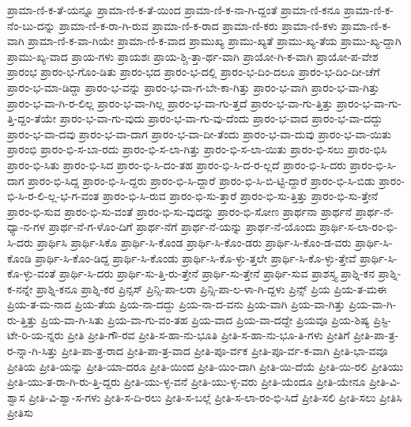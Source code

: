 {ಪ್ರಾಮಾ-ಣಿ-ಕ-ತೆ-ಯನ್ನೂ
ಪ್ರಾಮಾ-ಣಿ-ಕ-ತೆ-ಯಿಂದ
ಪ್ರಾಮಾ-ಣಿ-ಕ-ನಾ-ಗಿ-ದ್ದಂತೆ
ಪ್ರಾಮಾ-ಣಿ-ಕನೂ
ಪ್ರಾಮಾ-ಣಿ-ಕ-ನೆಂ-ಬು-ದನ್ನು
ಪ್ರಾಮಾ-ಣಿ-ಕ-ರಾ-ಗಿ-ರುವ
ಪ್ರಾಮಾ-ಣಿ-ಕ-ರಾದ
ಪ್ರಾಮಾ-ಣಿ-ಕರು
ಪ್ರಾಮಾ-ಣಿ-ಕಳು
ಪ್ರಾಮಾ-ಣಿ-ಕ-ವಾಗಿ
ಪ್ರಾಮಾ-ಣಿ-ಕ-ವಾ-ಗಿಯೇ
ಪ್ರಾಮಾ-ಣಿ-ಕ-ವಾದ
ಪ್ರಾಮುಖ್ಯ
ಪ್ರಾಮು-ಖ್ಯತೆ
ಪ್ರಾಮು-ಖ್ಯ-ತೆಯ
ಪ್ರಾಮು-ಖ್ಯ-ದ್ದಾಗಿ
ಪ್ರಾಮು-ಖ್ಯ-ವಾದ
ಪ್ರಾಯ-ಗಳು
ಪ್ರಾಯಶಃ
ಪ್ರಾಯ-ಶ್ಚಿ-ತ್ತಾ-ರ್ಥ-ವಾಗಿ
ಪ್ರಾಯೋ-ಗಿ-ಕ-ವಾಗಿ
ಪ್ರಾಯೋ-ಪ-ವೇಶ
ಪ್ರಾರಂಭ
ಪ್ರಾರಂ-ಭ-ಗೊಂ-ಡಿತು
ಪ್ರಾರಂ-ಭದ
ಪ್ರಾರಂ-ಭ-ದಲ್ಲಿ
ಪ್ರಾರಂ-ಭ-ದಿಂ-ದಲೂ
ಪ್ರಾರಂ-ಭ-ದಿಂ-ದೀ-ಚೆಗೆ
ಪ್ರಾರಂ-ಭ-ಮಾ-ಡಿದ್ದಾ
ಪ್ರಾರಂ-ಭ-ವನ್ನು
ಪ್ರಾರಂ-ಭ-ವಾ-ಗ-ಬೇ-ಕಾ-ಗಿತ್ತು
ಪ್ರಾರಂ-ಭ-ವಾಗಿ
ಪ್ರಾರಂ-ಭ-ವಾ-ಗಿತ್ತು
ಪ್ರಾರಂ-ಭ-ವಾ-ಗಿ-ರ-ಲಿಲ್ಲ
ಪ್ರಾರಂ-ಭ-ವಾ-ಗಿಲ್ಲ
ಪ್ರಾರಂ-ಭ-ವಾ-ಗು-ತ್ತದೆ
ಪ್ರಾರಂ-ಭ-ವಾ-ಗು-ತ್ತಿತ್ತು
ಪ್ರಾರಂ-ಭ-ವಾ-ಗು-ತ್ತಿ-ದ್ದಂ-ತೆಯೇ
ಪ್ರಾರಂ-ಭ-ವಾ-ಗು-ವುದು
ಪ್ರಾರಂ-ಭ-ವಾ-ಗು-ವು-ದೆಂದು
ಪ್ರಾರಂ-ಭ-ವಾದ
ಪ್ರಾರಂ-ಭ-ವಾ-ದದ್ದು
ಪ್ರಾರಂ-ಭ-ವಾ-ದವು
ಪ್ರಾರಂ-ಭ-ವಾ-ದಾಗ
ಪ್ರಾರಂ-ಭ-ವಾ-ದೀ-ತೆಂದು
ಪ್ರಾರಂ-ಭ-ವಾ-ದುವು
ಪ್ರಾರಂ-ಭ-ವಾ-ಯಿತು
ಪ್ರಾರಂಭಿ
ಪ್ರಾರಂ-ಭಿ-ಸ-ಬಾ-ರದು
ಪ್ರಾರಂ-ಭಿ-ಸ-ಲಾ-ಗಿತ್ತು
ಪ್ರಾರಂ-ಭಿ-ಸ-ಲಾ-ಯಿತು
ಪ್ರಾರಂ-ಭಿ-ಸಲು
ಪ್ರಾರಂ-ಭಿಸಿ
ಪ್ರಾರಂ-ಭಿ-ಸಿತು
ಪ್ರಾರಂ-ಭಿ-ಸಿದ
ಪ್ರಾರಂ-ಭಿ-ಸಿ-ದಂ-ತಹ
ಪ್ರಾರಂ-ಭಿ-ಸಿ-ದ-ರ-ಲ್ಲದೆ
ಪ್ರಾರಂ-ಭಿ-ಸಿ-ದರು
ಪ್ರಾರಂ-ಭಿ-ಸಿ-ದಾಗ
ಪ್ರಾರಂ-ಭಿ-ಸಿದ್ದ
ಪ್ರಾರಂ-ಭಿ-ಸಿ-ದ್ದರು
ಪ್ರಾರಂ-ಭಿ-ಸಿ-ದ್ದಾರೆ
ಪ್ರಾರಂ-ಭಿ-ಸಿ-ಬಿ-ಟ್ಟಿ-ದ್ದಾರೆ
ಪ್ರಾರಂ-ಭಿ-ಸಿ-ಬಿಡು
ಪ್ರಾರಂ-ಭಿ-ಸಿ-ರ-ಲಿ-ಲ್ಲ-ಭ-ಗ-ವಂತ
ಪ್ರಾರಂ-ಭಿ-ಸಿ-ರುವ
ಪ್ರಾರಂ-ಭಿ-ಸು-ತ್ತಾರೆ
ಪ್ರಾರಂ-ಭಿ-ಸು-ತ್ತಿತ್ತು
ಪ್ರಾರಂ-ಭಿ-ಸು-ತ್ತೇನೆ
ಪ್ರಾರಂ-ಭಿ-ಸುವ
ಪ್ರಾರಂ-ಭಿ-ಸು-ವಂತೆ
ಪ್ರಾರಂ-ಭಿ-ಸು-ವುದನ್ನು
ಪ್ರಾರಂ-ಭಿ-ಸೋಣ
ಪ್ರಾರ್ಥನಾ
ಪ್ರಾರ್ಥನೆ
ಪ್ರಾರ್ಥ-ನೆ-ಧ್ಯಾ-ನ-ಗಳ
ಪ್ರಾರ್ಥ-ನೆ-ಗ-ಳೊಂ-ದಿಗೆ
ಪ್ರಾರ್ಥ-ನೆಗೆ
ಪ್ರಾರ್ಥ-ನೆ-ಯನ್ನು
ಪ್ರಾರ್ಥ-ನೆ-ಯೊಂದು
ಪ್ರಾರ್ಥಿ-ಸ-ಲಾ-ರಂ-ಭಿ-ಸಿ-ದರು
ಪ್ರಾರ್ಥಿಸಿ
ಪ್ರಾರ್ಥಿ-ಸಿಕೊ
ಪ್ರಾರ್ಥಿ-ಸಿ-ಕೊಂಡ
ಪ್ರಾರ್ಥಿ-ಸಿ-ಕೊಂ-ಡರು
ಪ್ರಾರ್ಥಿ-ಸಿ-ಕೊಂ-ಡ-ವರು
ಪ್ರಾರ್ಥಿ-ಸಿ-ಕೊಂಡಿ
ಪ್ರಾರ್ಥಿ-ಸಿ-ಕೊಂ-ಡಿದ್ದ
ಪ್ರಾರ್ಥಿ-ಸಿ-ಕೊಂಡು
ಪ್ರಾರ್ಥಿ-ಸಿ-ಕೊ-ಳ್ಳು-ತ್ತಲೇ
ಪ್ರಾರ್ಥಿ-ಸಿ-ಕೊ-ಳ್ಳು-ತ್ತೇವೆ
ಪ್ರಾರ್ಥಿ-ಸಿ-ಕೊ-ಳ್ಳು-ವಂತೆ
ಪ್ರಾರ್ಥಿ-ಸಿ-ದರು
ಪ್ರಾರ್ಥಿ-ಸು-ತ್ತಿ-ರು-ತ್ತೇನೆ
ಪ್ರಾರ್ಥಿ-ಸು-ತ್ತೇನೆ
ಪ್ರಾರ್ಥಿ-ಸುವ
ಪ್ರಾಶಸ್ತ್ಯ
ಪ್ರಾಶ್ನಿ-ಕನ
ಪ್ರಾಶ್ನಿ-ಕ-ನನ್ನೇ
ಪ್ರಾಶ್ನಿ-ಕನೂ
ಪ್ರಾಶ್ನಿ-ಕರ
ಪ್ರಿನ್ಸಸ್
ಪ್ರಿನ್ಸಿ-ಪಾ-ಲರಾ
ಪ್ರಿನ್ಸಿ-ಪಾ-ಲ-ಳಾ-ಗಿ-ದ್ದಳು
ಪ್ರಿನ್ಸ್
ಪ್ರಿಯ
ಪ್ರಿಯ-ತ-ಮಈ
ಪ್ರಿಯ-ತ-ಮ-ನಾದ
ಪ್ರಿಯ-ತೆಯ
ಪ್ರಿಯ-ನಾ-ದದ್ದು
ಪ್ರಿಯ-ನಾ-ದ-ವನು
ಪ್ರಿಯ-ವಾಗಿ
ಪ್ರಿಯ-ವಾ-ಗಿತ್ತು
ಪ್ರಿಯ-ವಾ-ಗಿ-ರು-ತ್ತಿತ್ತು
ಪ್ರಿಯ-ವಾ-ಗಿ-ಸಿತು
ಪ್ರಿಯ-ವಾ-ಗು-ವಂ-ತಹ
ಪ್ರಿಯ-ವಾದ
ಪ್ರಿಯ-ವಾ-ದದ್ದೇ
ಪ್ರಿಯವೂ
ಪ್ರಿಯ-ಶಿಷ್ಯ
ಪ್ರಿಸ್ಟಿ-ಟೇ-ರಿ-ಯ-ನ್ನರು
ಪ್ರೀತಿ
ಪ್ರೀತಿ-ಗೌ-ರವ
ಪ್ರೀತಿ-ಸ-ಹಾ-ನು-ಭೂತಿ
ಪ್ರೀತಿ-ಸ-ಹಾ-ನು-ಭೂ-ತಿ-ಗಳು
ಪ್ರೀತಿಗೆ
ಪ್ರೀತಿ-ಪಾ-ತ್ರ-ರ-ನ್ನಾ-ಗಿ-ಸಿತ್ತು
ಪ್ರೀತಿ-ಪಾ-ತ್ರ-ರಾದ
ಪ್ರೀತಿ-ಪಾ-ತ್ರ-ವಾದ
ಪ್ರೀತಿ-ಪೂ-ರ್ವಕ
ಪ್ರೀತಿ-ಪೂ-ರ್ವ-ಕ-ವಾಗಿ
ಪ್ರೀತಿ-ಭಾ-ವವೂ
ಪ್ರೀತಿಯ
ಪ್ರೀತಿ-ಯನ್ನು
ಪ್ರೀತಿ-ಯಾ-ದರೂ
ಪ್ರೀತಿ-ಯಿಂದ
ಪ್ರೀತಿ-ಯಿಂ-ದಾಗಿ
ಪ್ರೀತಿ-ಯಿ-ದೆಯೆ
ಪ್ರೀತಿ-ಯಿ-ರಲಿ
ಪ್ರೀತಿಯು
ಪ್ರೀತಿ-ಯು-ತ-ರಾ-ಗಿ-ರು-ತ್ತಿ-ದ್ದರು
ಪ್ರೀತಿ-ಯು-ಳ್ಳ-ವನೆ
ಪ್ರೀತಿ-ಯು-ಳ್ಳ-ವರು
ಪ್ರೀತಿ-ಯೆಂದೂ
ಪ್ರೀತಿ-ಯೇನೂ
ಪ್ರೀತಿ-ವಿ-ಶ್ವಾಸ
ಪ್ರೀತಿ-ವಿ-ಶ್ವಾ-ಸ-ಗಳು
ಪ್ರೀತಿ-ಸ-ದಿ-ರಲು
ಪ್ರೀತಿ-ಸ-ಬಲ್ಲೆ
ಪ್ರೀತಿ-ಸ-ಲಾ-ರಂ-ಭಿ-ಸಿದೆ
ಪ್ರೀತಿ-ಸಲಿ
ಪ್ರೀತಿ-ಸಲು
ಪ್ರೀತಿಸಿ
ಪ್ರೀತಿಸು
}

